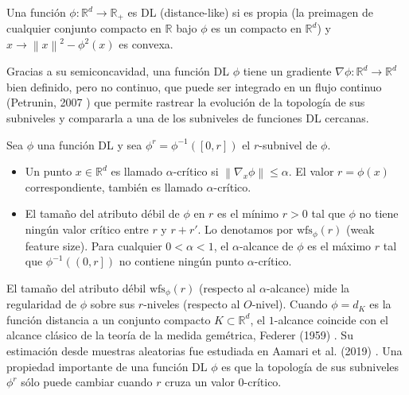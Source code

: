 \begin{definicion}
    Una funci\'on $\phi:\mathbb{R}^{d}\rightarrow\mathbb{R}_{+}$ es DL (distance-like) si es propia (la
    preimagen de cualquier conjunto compacto en $\mathbb{R}$ bajo $\phi$ es un compacto en
    $\mathbb{R}^{d}$) y $x\rightarrow\left\|x\right\|^{2}-\phi^{2}\left(x\right)$ es convexa.
\end{definicion}
 
Gracias a su semiconcavidad, una funci\'on DL $\phi$ tiene un gradiente
$\nabla\phi:\mathbb{R}^{d}\rightarrow\mathbb{R}^{d}$ bien definido, pero no continuo, que puede ser
integrado en un flujo continuo (Petrunin, 2007 \cite{Petrunin2007}) que permite rastrear la evoluci\'on
de la topolog\'ia de sus subniveles y compararla a una de los subniveles de funciones DL cercanas.
 
\begin{definicion}
    Sea $\phi$ una funci\'on DL y sea $\phi^{r}=\phi^{-1}\left(\left[0,r\right]\right)$ el $r$-subnivel
    de $\phi$.
    
    \begin{itemize}
        \item Un punto $x\in\mathbb{R}^{d}$ es llamado $\alpha$-cr\'itico si
        $\left\|\nabla_{x}\phi\right\|\leq\alpha$. El valor $r=\phi\left(x\right)$ correspondiente,
        tambi\'en es llamado $\alpha$-cr\'itico.
        
        \item El tama\~{n}o del atributo d\'ebil de $\phi$ en $r$ es el m\'inimo $r>0$ tal que $\phi$
        no tiene ning\'un valor cr\'itico entre $r$ y $r+r'$. Lo denotamos por
        $\mathrm{wfs}_{\phi}\left(r\right)$ (weak feature size). Para cualquier $0<\alpha<1$, el 
        $\alpha$-alcance de $\phi$ es el m\'aximo $r$ tal que $\phi^{-1}\left(\left(0,r\right]\right)$
        no contiene ning\'un punto $\alpha$-cr\'itico.
        
    \end{itemize}
\end{definicion}
 
El tama\~{n}o del atributo d\'ebil $\mathrm{wfs}_{\phi}\left(r\right)$ (respecto al $\alpha$-alcance)
mide la regularidad de $\phi$ sobre sus $r$-niveles (respecto al $O$-nivel). Cuando $\phi=d_{K}$ es
la funci\'on distancia a un conjunto compacto $K\subset\mathbb{R}^{d}$, el $1$-alcance coincide con el
alcance cl\'asico de la teor\'ia de la medida gem\'etrica, Federer (1959) \cite{Federer1959}. Su
estimaci\'on desde muestras aleatorias fue estudiada en Aamari et al. (2019) \cite{Aamari2019}. Una
propiedad importante de una funci\'on DL $\phi$ es que la topolog\'ia de sus subniveles $\phi^{r}$
s\'olo puede cambiar cuando $r$ cruza un valor $0$-cr\'itico.

